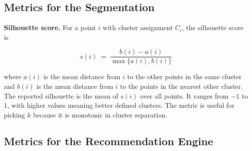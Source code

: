 \documentclass[12pt, a4paper]{report}
\numberwithin{figure}{chapter}
\numberwithin{table}{chapter}
\numberwithin{equation}{chapter}
\begin{document}
\subsection{Metrics for the Segmentation}

\textbf{Silhouette score.} For a point $i$ with cluster assignment $C_i$, the silhouette score is

\begin{equation}
s(i) \;=\; \frac{b(i) - a(i)}{\max\{ a(i), b(i) \}}
\label{eq:silhouette}
\end{equation}

\noindent where $a(i)$ is the mean distance from $i$ to the other points in the same cluster and $b(i)$ is the mean distance from $i$ to the points in the nearest other cluster. The reported silhouette is the mean of $s(i)$ over all points. It ranges from $-1$ to $1$, with higher values meaning better defined clusters. The metric is useful for picking $k$ because it is monotonic in cluster separation.







\subsection{Metrics for the Recommendation Engine}
\end{document}

